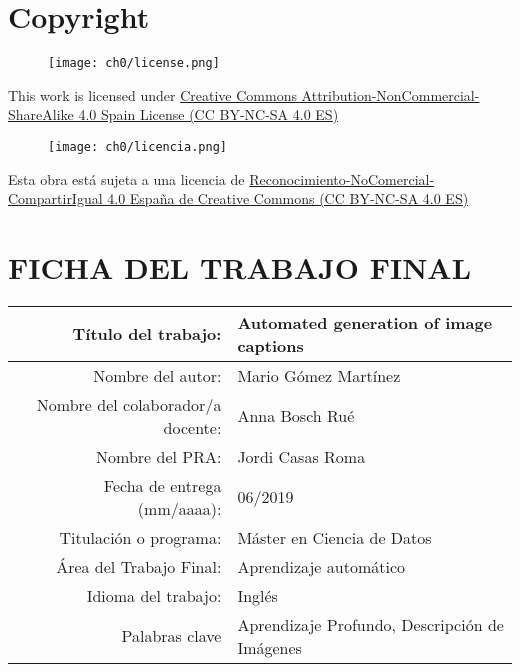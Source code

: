 \setcounter{page}{1} 
\pagestyle{plain}

\chapter*{Copyright}

\vspace{1cm}

\begin{figure}[ht]
    \centering
	\texttt{[image: ch0/license.png]}
\end{figure}

This work is licensed under \href{https://creativecommons.org/licenses/by-nc-sa/3.0/es/deed.en}{Creative Commons Attribution-NonCommercial-ShareAlike 4.0 Spain License (CC BY-NC-SA 4.0 ES)} 

\vspace{1cm}

\begin{figure}[ht]
    \centering
	\texttt{[image: ch0/licencia.png]}
\end{figure}

Esta obra está sujeta a una licencia de \href{https://creativecommons.org/licenses/by-nc-sa/4.0/es/}{Reconocimiento-NoComercial-CompartirIgual 4.0 España de Creative Commons (CC BY-NC-SA 4.0 ES)}


\chapter*{FICHA DEL TRABAJO FINAL}

\begin{table}[ht]
	\centering{}
	\renewcommand{\arraystretch}{2}
	\begin{tabular}{r | l}
		\hline
		Título del trabajo: & Automated generation of image captions\\
		\hline
        Nombre del autor: & Mario Gómez Martínez\\
		\hline
        Nombre del colaborador/a docente: & Anna Bosch Rué\\
		\hline
        Nombre del PRA: & Jordi Casas Roma\\
		\hline
        Fecha de entrega (mm/aaaa): & 06/2019\\
		\hline
        Titulación o programa: & Máster en Ciencia de Datos\\
		\hline
        Área del Trabajo Final: & Aprendizaje automático\\
		\hline
        Idioma del trabajo: & Inglés\\
		\hline
        Palabras clave & Aprendizaje Profundo, Descripción de Imágenes\\
		\hline
	\end{tabular}
\end{table}

